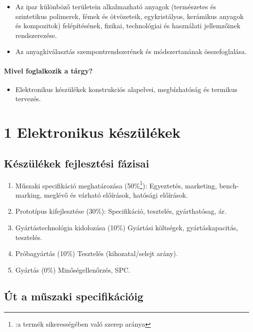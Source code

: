 \documentclass[12pt]{article}
\begin{document}
			\begin{itemize}
				\item Az ipar különböző területein alkalmazható anyagok (természetes és szintetikus polimerek, fémek és ötvözeteik, egykristályos, kerámikus anyagok és kompozitok) felépítésének, fizikai, technológiai és használati jellemzőinek rendszerezése.
				\item Az anyagkiválasztás szempontrendszerének és módszertanának összefoglalása.
			\end{itemize}

		\paragraph{Mivel foglalkozik a tárgy?} 

			\begin{itemize}
				\item Elektronikus készülékek konstrukciós alapelvei, megbízhatóság és termikus tervezés.
			\end{itemize}

	\section{1 Elektronikus készülékek}

		\subsection{Készülékek fejlesztési fázisai}

			\begin{enumerate}
				\item Műszaki specifikáció meghatározása (50\%\footnote[1]{:a termék sikerességében való szerep aránya}):
					\subitem Egyeztetés, marketing, bench-marking, meglévő és várható előírások, hatósági előírások.
				\item Prototípus kifejlesztése (30\%\footnotemark[1]):
					\subitem Specifikáció, tesztelés, gyárthatósag, ár.
				\item Gyártástechnológia kidolozása (10\%\footnotemark[1])
					\subitem Gyártási költségek, gyártáskapacitás, tesztelés.
				\item Próbagyártás (10\%\footnotemark[1])
					\subitem Tesztelés (kihozatal/selejt arány).
				\item Gyártás (0\%\footnotemark[1])
					\subitem Minőségellenőrzés, SPC.
			\end{enumerate}

		\subsection{Út a műszaki specifikációig}
			
\end{document}
